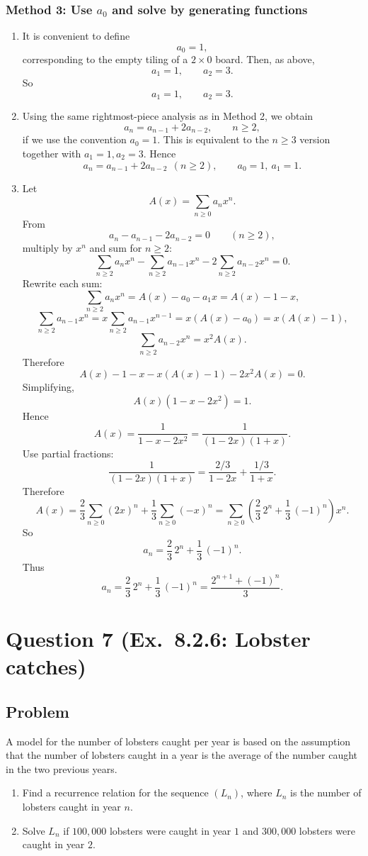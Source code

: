 \documentclass[12pt]{article}
\begin{document}
\subsubsection*{Method 3: Use \(a_0\) and solve by generating functions}
\begin{enumerate}[label=(\alph*)]
\item It is convenient to define
\[
a_0=1,
\]
corresponding to the empty tiling of a \(2\times 0\) board. Then, as above,
\[
a_1=1,\qquad a_2=3.
\]
So
\[
\boxed{a_1=1,\qquad a_2=3.}
\]

\item Using the same rightmost-piece analysis as in Method 2, we obtain
\[
a_n=a_{n-1}+2a_{n-2}, \qquad n\ge 2,
\]
if we use the convention \(a_0=1\). This is equivalent to the \(n\ge 3\) version together with \(a_1=1,a_2=3\). Hence
\[
\boxed{a_n=a_{n-1}+2a_{n-2}\ \ (n\ge 2), \qquad a_0=1,\ a_1=1.}
\]

\item Let
\[
A(x)=\sum_{n\ge 0} a_n x^n.
\]
From
\[
a_n-a_{n-1}-2a_{n-2}=0 \qquad (n\ge 2),
\]
multiply by \(x^n\) and sum for \(n\ge 2\):
\[
\sum_{n\ge 2} a_n x^n-\sum_{n\ge 2} a_{n-1}x^n-2\sum_{n\ge 2} a_{n-2}x^n=0.
\]
Rewrite each sum:
\[
\sum_{n\ge 2} a_n x^n=A(x)-a_0-a_1x=A(x)-1-x,
\]
\[
\sum_{n\ge 2} a_{n-1}x^n=x\sum_{n\ge 2} a_{n-1}x^{n-1}=x(A(x)-a_0)=x(A(x)-1),
\]
\[
\sum_{n\ge 2} a_{n-2}x^n=x^2A(x).
\]
Therefore
\[
A(x)-1-x-x(A(x)-1)-2x^2A(x)=0.
\]
Simplifying,
\[
A(x)(1-x-2x^2)=1.
\]
Hence
\[
A(x)=\frac{1}{1-x-2x^2}=\frac{1}{(1-2x)(1+x)}.
\]
Use partial fractions:
\[
\frac{1}{(1-2x)(1+x)}=\frac{2/3}{1-2x}+\frac{1/3}{1+x}.
\]
Therefore
\[
A(x)=\frac{2}{3}\sum_{n\ge 0}(2x)^n+\frac{1}{3}\sum_{n\ge 0}(-x)^n
=\sum_{n\ge 0}\left(\frac23\,2^n+\frac13\,(-1)^n\right)x^n.
\]
So
\[
a_n=\frac23\,2^n+\frac13\,(-1)^n.
\]
Thus
\[
\boxed{a_n=\frac23\,2^n+\frac13\,(-1)^n=\frac{2^{n+1}+(-1)^n}{3}.}
\]
\end{enumerate}

\newpage

\section{Question 7 (Ex.\ 8.2.6: Lobster catches)}

\subsection{Problem}
A model for the number of lobsters caught per year is based on the assumption that the number of lobsters caught in a year is the average of the number caught in the two previous years.
\begin{enumerate}[label=(\alph*)]
\item Find a recurrence relation for the sequence \((L_n)\), where \(L_n\) is the number of lobsters caught in year \(n\).
\item Solve \(L_n\) if \(100{,}000\) lobsters were caught in year \(1\) and \(300{,}000\) lobsters were caught in year \(2\).
\end{enumerate}
\end{document}
